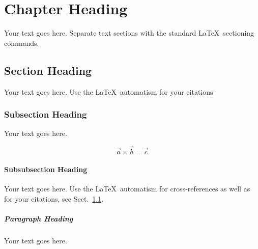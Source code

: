 %
%
%

\chapter{Chapter Heading}
\label{Introduction} 

Your text goes here. Separate text sections with the standard \LaTeX\
sectioning commands.

\section{Section Heading}
\label{sec:1}
Your text goes here. Use the \LaTeX\ automatism for your citations

\subsection{Subsection Heading}
\label{sec:2}
Your text goes here.

\begin{equation}
\vec{a}\times\vec{b}=\vec{c}
\end{equation}

\subsubsection{Subsubsection Heading}
Your text goes here. Use the \LaTeX\ automatism for cross-references as
well as for your citations, see Sect.~\ref{sec:1}.

\paragraph{Paragraph Heading} %
Your text goes here.

